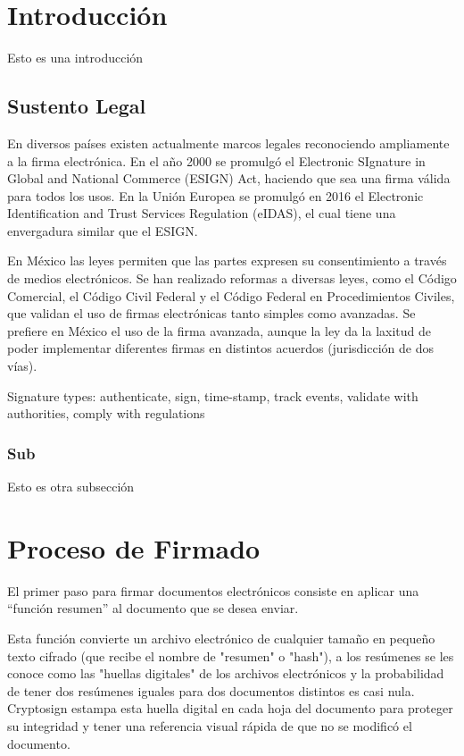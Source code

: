 \documentclass[letterpaper, 12pt]{article}
\begin{document}





\section{Introducción}
Esto es una introducción
\subsection{Sustento Legal}
En diversos países existen actualmente marcos legales reconociendo ampliamente a la firma electrónica. En el año 2000 se promulgó el Electronic SIgnature in Global and National Commerce (ESIGN) Act, haciendo que sea una firma válida para todos los usos. En la Unión Europea se promulgó en 2016 el Electronic Identification and Trust Services Regulation (eIDAS), el cual tiene una envergadura similar que el ESIGN. 

En México las leyes permiten que las partes expresen su consentimiento a través de medios electrónicos. Se han realizado reformas a diversas leyes, como el Código Comercial, el Código Civil Federal y el Código Federal en Procedimientos Civiles, que validan el uso de firmas electrónicas tanto simples como avanzadas. Se prefiere en México el uso de la firma avanzada, aunque la ley da la laxitud de poder implementar diferentes firmas en distintos acuerdos (jurisdicción de dos vías).


Signature types: authenticate, sign, time-stamp, track events, validate with authorities, comply with regulations

\subsubsection{Sub}
Esto es otra subsección
\section{Proceso de Firmado}
El primer paso para firmar documentos electrónicos consiste en aplicar una “función resumen” al documento que se desea enviar.

Esta función convierte un archivo electrónico de cualquier tamaño en pequeño texto cifrado (que recibe el nombre de "resumen" o "hash"), a los resúmenes se les conoce como las "huellas digitales" de los archivos electrónicos y la probabilidad de tener dos resúmenes iguales para dos documentos distintos es casi nula. Cryptosign estampa esta huella digital en cada hoja del documento para proteger su integridad y tener una referencia visual rápida de que no se modificó el documento.
\end{document}
